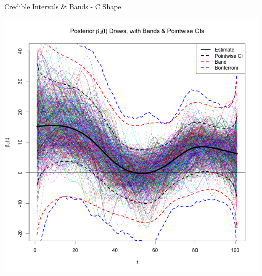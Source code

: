 \documentclass[9 pt]{beamer}
\begin{document}
\begin{frame}{Credible Intervals \& Bands - C Shape}

\begin{center}

\includegraphics[scale=.37]{pics/Figure_Bands_C_Shape_12-19-12_bonf.png}

\end{center}
\end{frame}
\end{document}
